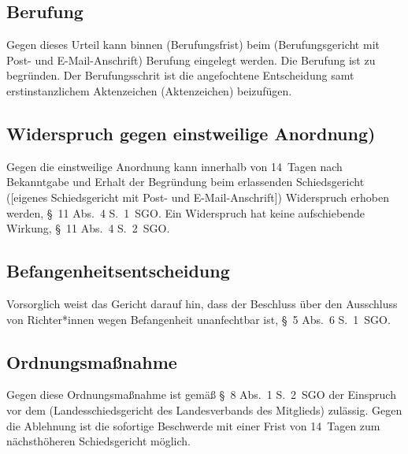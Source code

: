 \subsection{Berufung}
\label{Vorlage:RMB_Berufung}
Gegen dieses Urteil kann binnen (Berufungsfrist) beim (Berufungsgericht mit Post- und E-Mail-Anschrift) Berufung eingelegt werden.
Die Berufung ist zu begründen.
Der Berufungsschrit ist die angefochtene Entscheidung samt erstinstanzlichem Aktenzeichen (Aktenzeichen) beizufügen.

\subsection{Widerspruch gegen einstweilige Anordnung)}
\label{Vorlage:RMB_einstweilige}
Gegen die einstweilige Anordnung kann innerhalb von 14~Tagen nach Bekanntgabe und Erhalt der Begründung beim erlassenden Schiedsgericht ([eigenes Schiedsgericht mit Post- und E-Mail-Anschrift]) Widerspruch erhoben werden, \S~11 Abs.~4 S.~1~SGO.
Ein Widerspruch hat keine aufschiebende Wirkung, \S~11 Abs.~4 S.~2~SGO.

\subsection{Befangenheitsentscheidung}
\label{Vorlage:RMB_na}
Vorsorglich weist das Gericht darauf hin, dass der Beschluss über den Ausschluss von Richter*innen wegen Befangenheit unanfechtbar ist, \S~5 Abs.~6 S.~1~SGO.

\subsection{Ordnungsmaßnahme}
Gegen diese Ordnungsmaßnahme ist gemäß \S~8 Abs.~1 S.~2~SGO der Einspruch vor dem (Landesschiedsgericht des Landesverbands des Mitglieds) zulässig.
Gegen die Ablehnung ist die sofortige Beschwerde mit einer Frist von 14~Tagen zum nächsthöheren Schiedsgericht möglich.
